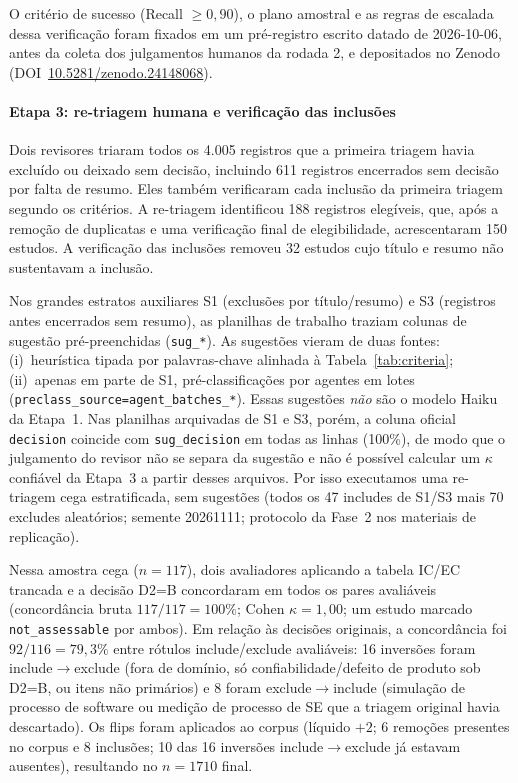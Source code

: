 \documentclass[preprint,12pt,authoryear=false]{elsarticle}
\begin{document}
O critério de sucesso (Recall $\geq 0{,}90$), o plano amostral e as regras de escalada dessa verificação foram fixados em um pré-registro escrito datado de 2026-10-06, antes da coleta dos julgamentos humanos da rodada 2, e depositados no Zenodo (DOI~\href{https://doi.org/10.5281/zenodo.24148068}{10.5281/zenodo.24148068}).

\paragraph{Etapa 3: re-triagem humana e verificação das inclusões}
Dois revisores triaram todos os 4.005 registros que a primeira triagem havia excluído ou deixado sem decisão, incluindo 611 registros encerrados sem decisão por falta de resumo. Eles também verificaram cada inclusão da primeira triagem segundo os critérios. A re-triagem identificou 188 registros elegíveis, que, após a remoção de duplicatas e uma verificação final de elegibilidade, acrescentaram 150 estudos. A verificação das inclusões removeu 32 estudos cujo título e resumo não sustentavam a inclusão.

Nos grandes estratos auxiliares S1 (exclusões por título/resumo) e S3 (registros antes encerrados sem resumo), as planilhas de trabalho traziam colunas de sugestão pré-preenchidas (\texttt{sug\_*}). As sugestões vieram de duas fontes: (i)~heurística tipada por palavras-chave alinhada à Tabela~\ref{tab:criteria}; (ii)~apenas em parte de S1, pré-classificações por agentes em lotes (\texttt{preclass\_source=agent\_batches\_*}). Essas sugestões \emph{não} são o modelo Haiku da Etapa~1. Nas planilhas arquivadas de S1 e S3, porém, a coluna oficial \texttt{decision} coincide com \texttt{sug\_decision} em todas as linhas (100\%), de modo que o julgamento do revisor não se separa da sugestão e não é possível calcular um $\kappa$ confiável da Etapa~3 a partir desses arquivos. Por isso executamos uma re-triagem cega estratificada, sem sugestões (todos os 47 includes de S1/S3 mais 70 excludes aleatórios; semente 20261111; protocolo da Fase~2 nos materiais de replicação).

Nessa amostra cega ($n = 117$), dois avaliadores aplicando a tabela IC/EC trancada e a decisão D2=B concordaram em todos os pares avaliáveis (concordância bruta $117/117 = 100\%$; Cohen $\kappa = 1{,}00$; um estudo marcado \texttt{not\_assessable} por ambos). Em relação às decisões originais, a concordância foi $92/116 = 79{,}3\%$ entre rótulos include/exclude avaliáveis: 16 inversões foram include$\rightarrow$exclude (fora de domínio, só confiabilidade/defeito de produto sob D2=B, ou itens não primários) e 8 foram exclude$\rightarrow$include (simulação de processo de software ou medição de processo de SE que a triagem original havia descartado). Os flips foram aplicados ao corpus (líquido $+2$; 6 remoções presentes no corpus e 8 inclusões; 10 das 16 inversões include$\rightarrow$exclude já estavam ausentes), resultando no $n = 1710$ final.
\end{document}
